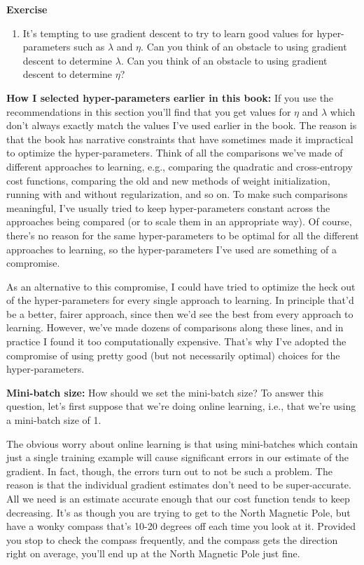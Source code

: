 \textbf{Exercise}

\begin{enumerate}
\item It's tempting to use gradient descent to try to learn good values for hyper-parameters such as $\lambda$     and $\eta$. Can you think of an obstacle to using gradient descent to determine $\lambda$. Can you think of an obstacle to using gradient descent to determine $\eta$?    
\end{enumerate}

\textbf{How I selected hyper-parameters earlier in this book:} If you use the recommendations in this section you'll find that you get values for $\eta$ and $\lambda$ which don't always exactly match the values I've used earlier in the book. The reason is that the book has narrative constraints that have sometimes made it impractical to optimize the hyper-parameters. Think of all the comparisons we've made of different approaches to learning, e.g., comparing the quadratic and cross-entropy cost functions, comparing the old and new methods of weight initialization, running with and without regularization, and so on. To make such comparisons meaningful, I've usually tried to keep hyper-parameters constant across the approaches being compared (or to scale them in an appropriate way). Of course, there's no reason for the same hyper-parameters to be optimal for all the different approaches to learning, so the hyper-parameters I've used are something of a compromise.

As an alternative to this compromise, I could have tried to optimize the heck out of the hyper-parameters for every single approach to learning. In principle that'd be a better, fairer approach, since then we'd see the best from every approach to learning. However, we've made dozens of comparisons along these lines, and in practice I found it too computationally expensive. That's why I've adopted the compromise of using pretty good (but not necessarily optimal) choices for the hyper-parameters.

\textbf{Mini-batch size:} How should we set the mini-batch size? To answer this question, let's first suppose that we're doing online learning, i.e., that we're using a mini-batch size of 1.

The obvious worry about online learning is that using mini-batches which contain just a single training example will cause significant errors in our estimate of the gradient. In fact, though, the errors turn out to not be such a problem. The reason is that the individual gradient estimates don't need to be super-accurate. All we need is an estimate accurate enough that our cost function tends to keep decreasing. It's as though you are trying to get to the North Magnetic Pole, but have a wonky compass that's 10-20 degrees off each time you look at it. Provided you stop to check the compass frequently, and the compass gets the direction right on average, you'll end up at the North Magnetic Pole just fine.

